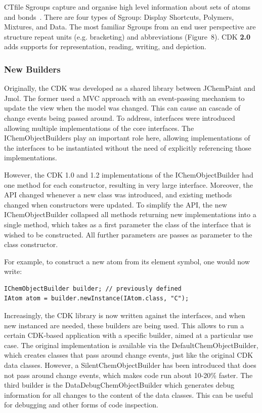 \documentclass[10pt]{bmcart}
\begin{document}
CTfile Sgroups capture and organise high level information about sets of atoms
and bonds~\cite{Gushurst91}. There are four types of Sgroup: Display Shortcuts, Polymers,
Mixtures, and Data. The most familiar Sgroups from an end user perspective are structure 
repeat units (e.g. bracketing) and abbreviations (Figure~8\label{fig:sgroups}). CDK \textbf{2.0} adds 
supports for representation, reading, writing, and depiction.


  \subsubsection*{New Builders}

Originally, the CDK was developed as a shared library between JChemPaint and Jmol. The former
used a MVC approach with an event-passing mechanism to update the view when the model was
changed. This can cause an cascade of change events being passed around. To address,
interfaces were introduced allowing multiple implementations of the core interfaces.
The IChemObjectBuilders play an important role here, allowing implementations of the
interfaces to be instantiated without the need of explicitly referencing those implementations.

However, the CDK 1.0 and 1.2 implementations of the IChemObjectBuilder had one method for
each constructor, resulting in very large interface. Moreover, the API changed whenever
a new class was introduced, and existing methods changed when constructors were updated.
To simplify the API, the new IChemObjectBuilder collapsed all methods returning new
implementations into a single method, which takes as a first parameter the class of the
interface that is wished to be constructed. All further parameters are passes as
parameter to the class constructor.

For example, to construct a new atom from its element symbol, one would now write:

\begin{verbatim}
IChemObjectBuilder builder; // previously defined
IAtom atom = builder.newInstance(IAtom.class, "C");
\end{verbatim}

Increasingly, the CDK library is now written against the interfaces, and when new instanced
are needed, these builders are being used. This allows to run a certain CDK-based
application with a specific builder, aimed at a particular use case. The original
implementation is available via the DefaultChemObjectBuilder, which creates
classes that pass around change events, just like the original CDK data classes.
However, a SilentChemObjectBuilder has been introduced that does not pass around
change events, which makes code run about 10-20\% faster.
The third builder is the DataDebugChemObjectBuilder which generates debug information
for all changes to the content of the data classes. This can be useful for
debugging and other forms of code inspection.
\end{document}
